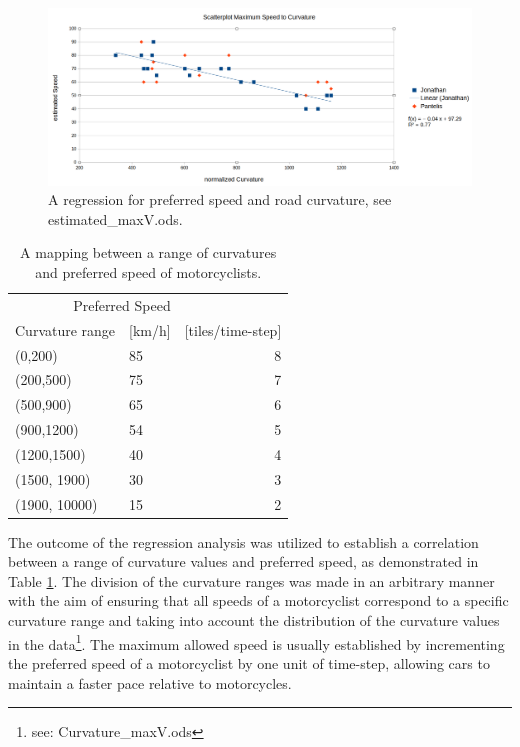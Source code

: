 \begin{figure}[h]
    \centering
    \includegraphics[width=1.0\linewidth]{images/regression.png}
    \caption{A regression for preferred speed and road curvature, see estimated\_maxV.ods.}
    \label{fig:regressionPrefspeed}
\end{figure}

    \begin{table}[htb]
    \centering
    \begin{tabular}{@{}llr@{}} \toprule
    \multicolumn{2}{r}{Preferred Speed}             \\ \cmidrule(l){2-3}
        Curvature range & [km/h] & [tiles/time-step]        \\ \midrule
        (0,200)         & 85        & 8 \\
        (200,500)       & 75        & 7 \\
        (500,900)       & 65        & 6 \\
        (900,1200)      & 54        & 5 \\
        (1200,1500)     & 40        & 4 \\
        (1500, 1900)    & 30        & 3 \\
        (1900, 10000)   & 15        & 2 \\ \bottomrule
    \end{tabular}
    \caption{A mapping between a range of curvatures and preferred speed of motorcyclists.} 
    \label{tab:dictPrefspeed}
    \end{table}
The outcome of the regression analysis was utilized to establish a correlation between a range of curvature values and preferred speed, as demonstrated in Table \ref{tab:dictPrefspeed}. The division of the curvature ranges was made in an arbitrary manner with the aim of ensuring that all speeds of a motorcyclist correspond to a specific curvature range and taking into account the distribution of the curvature values in the data\footnote{see: Curvature\_maxV.ods}. The maximum allowed speed is usually established by incrementing the preferred speed of a motorcyclist by one unit of time-step, allowing cars to maintain a faster pace relative to motorcycles.

